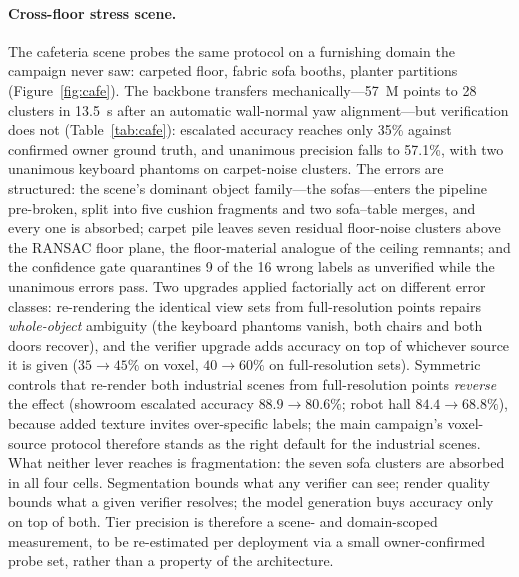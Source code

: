 \paragraph{Cross-floor stress scene.}
The cafeteria scene probes the same protocol on a furnishing domain the
campaign never saw: carpeted floor, fabric sofa booths, planter partitions
(Figure~\ref{fig:cafe}). The backbone transfers mechanically---57~M points to
28 clusters in 13.5~s after an automatic wall-normal yaw alignment---but
verification does not (Table~\ref{tab:cafe}): escalated accuracy reaches only
35\% against confirmed owner ground truth, and unanimous precision falls to
57.1\%, with two unanimous keyboard phantoms on carpet-noise clusters. The
errors are structured: the scene's dominant object family---the sofas---enters
the pipeline pre-broken, split into five cushion fragments and two sofa--table
merges, and every one is absorbed; carpet pile leaves seven residual
floor-noise clusters above the RANSAC floor plane, the floor-material analogue
of the ceiling remnants; and the confidence gate quarantines 9 of the 16 wrong
labels as unverified while the unanimous errors pass. Two upgrades applied
factorially act on different error classes: re-rendering the identical view
sets from full-resolution points repairs \emph{whole-object} ambiguity (the
keyboard phantoms vanish, both chairs and both doors recover), and the
verifier upgrade adds accuracy on top of whichever source it is given
($35\rightarrow45\%$ on voxel, $40\rightarrow60\%$ on full-resolution sets).
Symmetric controls that re-render both industrial scenes from full-resolution
points \emph{reverse} the effect (showroom escalated accuracy
$88.9\rightarrow80.6\%$; robot hall $84.4\rightarrow68.8\%$), because added
texture invites over-specific labels; the main campaign's voxel-source
protocol therefore stands as the right default for the industrial scenes.
What neither lever reaches is fragmentation: the seven sofa clusters are
absorbed in all four cells. Segmentation bounds what any verifier can see;
render quality bounds what a given verifier resolves; the model generation
buys accuracy only on top of both. Tier precision is therefore a scene- and
domain-scoped measurement, to be re-estimated per deployment via a small
owner-confirmed probe set, rather than a property of the architecture.

